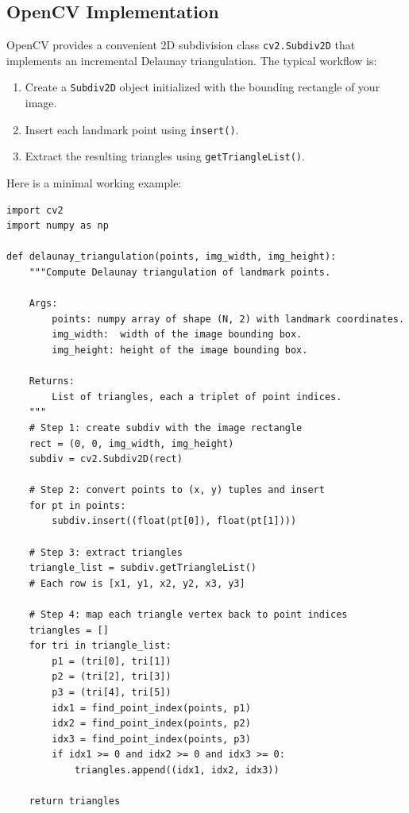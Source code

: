 \subsection{OpenCV Implementation}

OpenCV provides a convenient 2D subdivision class \texttt{cv2.Subdiv2D} that
implements an incremental Delaunay triangulation.  The typical workflow is:

\begin{enumerate}
    \item Create a \texttt{Subdiv2D} object initialized with the bounding
    rectangle of your image.
    \item Insert each landmark point using \texttt{insert()}.
    \item Extract the resulting triangles using \texttt{getTriangleList()}.
\end{enumerate}

Here is a minimal working example:

\begin{verbatim}
import cv2
import numpy as np

def delaunay_triangulation(points, img_width, img_height):
    """Compute Delaunay triangulation of landmark points.

    Args:
        points: numpy array of shape (N, 2) with landmark coordinates.
        img_width:  width of the image bounding box.
        img_height: height of the image bounding box.

    Returns:
        List of triangles, each a triplet of point indices.
    """
    # Step 1: create subdiv with the image rectangle
    rect = (0, 0, img_width, img_height)
    subdiv = cv2.Subdiv2D(rect)

    # Step 2: convert points to (x, y) tuples and insert
    for pt in points:
        subdiv.insert((float(pt[0]), float(pt[1])))

    # Step 3: extract triangles
    triangle_list = subdiv.getTriangleList()
    # Each row is [x1, y1, x2, y2, x3, y3]

    # Step 4: map each triangle vertex back to point indices
    triangles = []
    for tri in triangle_list:
        p1 = (tri[0], tri[1])
        p2 = (tri[2], tri[3])
        p3 = (tri[4], tri[5])
        idx1 = find_point_index(points, p1)
        idx2 = find_point_index(points, p2)
        idx3 = find_point_index(points, p3)
        if idx1 >= 0 and idx2 >= 0 and idx3 >= 0:
            triangles.append((idx1, idx2, idx3))

    return triangles
\end{verbatim}


